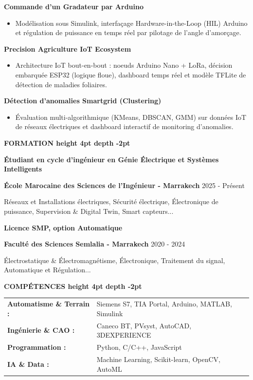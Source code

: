 \documentclass[10pt,a4paper]{altacv}
\renewcommand{\cvsection}[2][]{%
  \medskip%
  {\color{heading}\LARGE\bfseries #2 \hspace{0.2em}\leaders\vrule height 4pt depth -2pt\hfill\mbox{}}\par\smallskip
}
\renewcommand{\cvevent}[4]{%
  {\large\bfseries\color{accent}#1\par}
  \smallskip\normalsize
  \ifstrequal{#2}{}{}{%
    \textbf{\color{emphasis}#2\ifstrequal{#4}{}{}{ - #4}}%
  }%
  \hfill
  \ifstrequal{#3}{}{}{\small#3}%
  \par\smallskip
}
\begin{document}
{\large\bfseries\color{accent} Commande d'un Gradateur par Arduino}\\[0.03cm]
\begin{itemize}
  \item Modélisation sous Simulink, interfaçage Hardware-in-the-Loop (HIL) Arduino et régulation de puissance en temps réel par pilotage de l'angle d'amorçage.
\end{itemize}

{\large\bfseries\color{accent} Precision Agriculture IoT Ecosystem}\\[0.03cm]
\begin{itemize}
  \item Architecture IoT bout-en-bout : noeuds Arduino Nano + LoRa, décision embarquée ESP32 (logique floue), dashboard temps réel et modèle TFLite de détection de maladies foliaires.
\end{itemize}

{\large\bfseries\color{accent} Détection d'anomalies Smartgrid (Clustering)}\\[0.03cm]
\begin{itemize}
  \item Évaluation multi-algorithmique (KMeans, DBSCAN, GMM) sur données IoT de réseaux électriques et dashboard interactif de monitoring d'anomalies.
\end{itemize}


\cvsection{FORMATION}
\cvevent{Étudiant en cycle d'ingénieur en Génie Électrique et Systèmes Intelligents}{École Marocaine des Sciences de l'Ingénieur}{2025 - Présent}{Marrakech}
\small Réseaux et Installations électriques, Sécurité électrique, Électronique de puissance, Supervision \& Digital Twin, Smart capteurs...

\cvevent{Licence SMP, option Automatique}{Faculté des Sciences Semlalia}{2020 - 2024}{Marrakech}
\small Électrostatique \& Électromagnétisme, Électronique, Traitement du signal, Automatique et Régulation...

\cvsection{COMPÉTENCES}
\begin{tabular}{@{}ll@{}}
\textbf{Automatisme \& Terrain :} & Siemens S7, TIA Portal, Arduino, MATLAB, Simulink \\[4pt]
\textbf{Ingénierie \& CAO :}      & Caneco BT, PVsyst, AutoCAD, 3DEXPERIENCE \\[4pt]
\textbf{Programmation :}          & Python, C/C++, JavaScript \\[4pt]
\textbf{IA \& Data :}             & Machine Learning, Scikit-learn, OpenCV, AutoML \\
\end{tabular}
\end{document}
